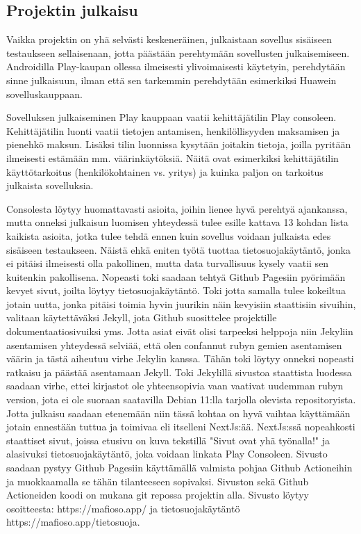 \subsection{Projektin julkaisu}

Vaikka projektin on yhä selvästi keskeneräinen, julkaistaan sovellus sisäiseen
testaukseen sellaisenaan, jotta päästään perehtymään sovellusten
julkaisemiseen. Androidilla Play-kaupan ollessa ilmeisesti ylivoimaisesti
käytetyin, perehdytään sinne julkaisuun, ilman että sen tarkemmin perehdytään
esimerkiksi Huawein sovelluskauppaan.

Sovelluksen julkaiseminen Play kauppaan vaatii kehittäjätilin Play consoleen.
Kehittäjätilin luonti vaatii tietojen antamisen, henkilöllisyyden maksamisen
ja pienehkö maksun. Lisäksi tilin luonnissa kysytään joitakin tietoja, joilla
pyritään ilmeisesti estämään mm. väärinkäytöksiä. Näitä ovat esimerkiksi
kehittäjätilin käyttötarkoitus (henkilökohtainen vs. yritys) ja kuinka paljon
on tarkoitus julkaista sovelluksia.

Consolesta löytyy huomattavasti asioita, joihin lienee hyvä perehtyä
ajankanssa, mutta onneksi julkaisun luomisen yhteydessä tulee esille kattava 13
kohdan lista kaikista asioita, jotka tulee tehdä ennen kuin sovellus voidaan
julkaista edes sisäiseen testaukseen. Näistä ehkä eniten työtä tuottaa
tietosuojakäytäntö, jonka ei pitäisi ilmeisesti olla pakollinen, mutta data
turvallisuus kysely vaatii sen kuitenkin pakollisena. Nopeasti toki saadaan
tehtyä Github Pagesiin pyörimään kevyet sivut, joilta löytyy
tietosuojakäytäntö. Toki jotta samalla tulee kokeiltua jotain uutta, jonka
pitäisi toimia hyvin juurikin näin kevyisiin staattisiin sivuihin, valitaan
käytettäväksi Jekyll, jota Github suosittelee projektille dokumentaatiosivuiksi
yms. Jotta asiat eivät olisi tarpeeksi helppoja niin Jekyliin asentamisen
yhteydessä selviää, että olen confannut rubyn gemien asentamisen väärin ja
tästä aiheutuu virhe Jekylin kanssa. Tähän toki löytyy onneksi nopeasti
ratkaisu \parencite{StakOverflowRubyGemsPermissionsDenied} ja päästää
asentamaan Jekyll. Toki Jekylillä sivustoa staattista luodessa saadaan virhe,
ettei kirjastot ole yhteensopivia vaan vaativat uudemman rubyn version, jota
ei ole suoraan saatavilla Debian 11:lla tarjolla olevista repositoryista. Jotta
julkaisu saadaan etenemään niin tässä kohtaa on hyvä vaihtaa käyttämään jotain
ennestään tuttua ja toimivaa eli itselleni NextJs:ää. NextJs:ssä nopeahkosti
staattiset sivut, joissa etusivu on kuva tekstillä "Sivut ovat yhä työnalla!"
ja alasivuksi tietosuojakäytäntö, joka voidaan linkata Play Consoleen. Sivusto
saadaan pystyy Github Pagesiin käyttämällä valmista pohjaa Github Actioneihin ja
muokkaamalla se tähän tilanteeseen sopivaksi. Sivuston sekä Github Actioneiden
koodi on mukana git repossa projektin alla. Sivusto löytyy osoitteesta:
https://mafioso.app/ ja tietosuojakäytäntö https://mafioso.app/tietosuoja.

